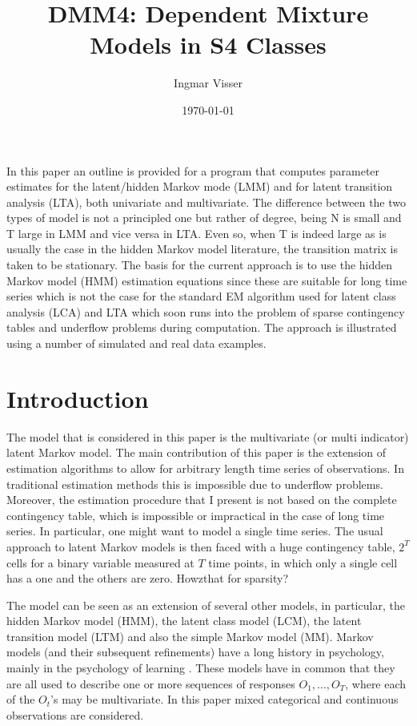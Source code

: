 \documentclass[a4paper,12pt,doc]{apaIngmar} %
\title{DMM4: Dependent Mixture Models in S4 Classes}
\author{Ingmar Visser}
\date{\today}
\affiliation{Department of Psychology, University of Amsterdam\\
 
 Correspondence concerning this article should be addressed to:
 \\
 Ingmar Visser \\
 Department of Psychology, University of Amsterdam \\
 Roetersstraat 15 \\
 1018 WB Amsterdam \\
 phone: +31 (20) 5256735 \\
 fax: +31 (20) 6390279 \\
 email: i.visser@uva.nl}
\newcommand{\citep}{\cite}
\begin{document}


\maketitle

\newpage

In this paper an outline is provided for a program that computes
parameter estimates for the latent/hidden Markov mode (LMM) and for
latent transition analysis (LTA), both univariate and multivariate.
The difference between the two types of model is not a principled one
but rather of degree, being N is small and T large in LMM and vice
versa in LTA. Even so, when T is indeed large as is usually the case
in the hidden Markov model literature, the transition matrix is taken
to be stationary.  The basis for the current approach is to use the
hidden Markov model (HMM) estimation equations since these are
suitable for long time series which is not the case for the standard
EM algorithm used for latent class analysis (LCA) and LTA which soon
runs into the problem of sparse contingency tables and underflow
problems during computation.  The approach is illustrated using a
number of simulated and real data examples.


\section{Introduction}

The model that is considered in this paper is the multivariate (or
multi indicator) latent Markov model.  The main contribution of this
paper is the extension of estimation algorithms to allow for arbitrary
length time series of observations.  In traditional estimation methods
this is impossible due to underflow problems.  Moreover, the
estimation procedure that I present is not based on the complete
contingency table, which is impossible or impractical in the case of
long time series.  In particular, one might want to model a single
time series.  The usual approach to latent Markov models is then faced
with a huge contingency table, $2^{T}$ cells for a binary variable
measured at $T$ time points, in which only a single cell has a one and
the others are zero.  Howzthat for sparsity?

The model can be seen as an extension of several other models, in
particular, the hidden Markov model (HMM), the latent class model
(LCM), the latent transition model (LTM) and also the simple Markov
model (MM).  Markov models (and their subsequent refinements) have a
long history in psychology, mainly in the psychology of learning
\citep{Wickens1982}.  These models have in common that they are all
used to describe one or more sequences of responses $O_{1}, \ldots,
O_{T}$, where each of the $O_{t}$'s may be multivariate.  In this
paper mixed categorical and continuous observations are considered.
\end{document}
